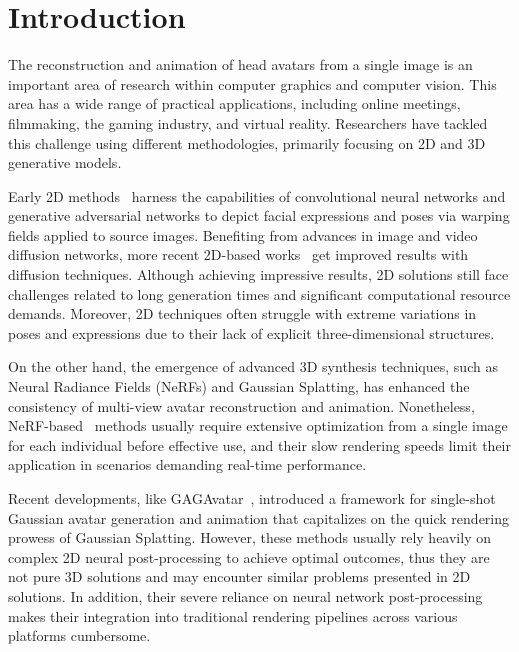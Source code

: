 
\section{Introduction}

The reconstruction and animation of head avatars from a single image is an important area of research within computer graphics and computer vision. This area has a wide range of practical applications, including 
online meetings, filmmaking, the gaming industry, and virtual reality.
Researchers have tackled this challenge using different methodologies, primarily focusing on 2D and 3D generative models.

Early 2D methods~\cite{DBLP:conf/cvpr/KarrasLAHLA20,DBLP:conf/cvpr/IsolaZZE17,DBLP:conf/nips/GoodfellowPMXWOCB14} harness the capabilities of convolutional neural networks and generative adversarial networks to depict facial expressions and poses via warping fields applied to source images. Benefiting from advances in image and video diffusion networks, more recent 2D-based works~\cite{DBLP:journals/corr/abs-2410-07718,DBLP:journals/corr/abs-2406-08801,DBLP:conf/eccv/TianWZB24} get improved results with diffusion techniques. 
Although achieving impressive results, 2D solutions still face challenges related to long generation times and significant computational resource demands.
Moreover, 2D techniques often struggle with extreme variations in poses and expressions due to their lack of explicit three-dimensional structures.

On the other hand, the emergence of advanced 3D synthesis techniques, such as Neural Radiance Fields (NeRFs) and Gaussian Splatting, has enhanced the consistency of multi-view avatar reconstruction and animation. Nonetheless, NeRF-based~\cite{DBLP:conf/cvpr/GafniTZN21,DBLP:conf/eccv/KiMC24,DBLP:conf/cvpr/BaiFWZSYS23,PointAvatar,Nerfies,DBLP:conf/siggraph/YuFZWYBCSWSW23,DBLP:conf/cvpr/MaZQLZ23,DBLP:conf/cvpr/LiZWZ0CZWB023} methods usually require extensive optimization from a single image for each individual before effective use, and their slow rendering speeds limit their application in scenarios demanding real-time performance. 

Recent developments, like GAGAvatar~\cite{GAGAvatar}, introduced a framework for single-shot Gaussian avatar generation and animation that capitalizes on the quick rendering prowess of Gaussian Splatting. 
However, these methods usually rely heavily on complex 2D neural post-processing to achieve optimal outcomes, thus they are not pure 3D solutions and may encounter similar problems presented in 2D solutions.
In addition, their severe reliance on neural network post-processing makes their integration into traditional rendering pipelines across various platforms cumbersome.

